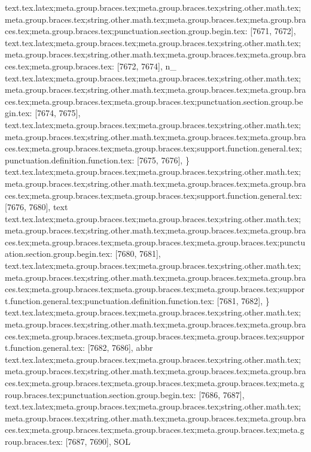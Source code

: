 {{{{{{{{{{{{{{{{{{{{{{{{{{{{{{{{{{{{{{{{{{{{{{{{{{{{{{{{{{{{{{{{{{{{{{{{{{{{{{{{{{{{{{{{{{{{{{{{{{{{{{{{{{{{{{{{{{{{{{{{{{{{{{{{{{{{{{{{{{{{{{{{{{{{{{{{{{{{{{{{{{{{{{{{{{{{{{{{{{{{{{{{{{{{{{{{{{{{{{{{{{{{{{{{{{{{{{{{{{text.tex.latex;meta.group.braces.tex;meta.group.braces.tex;string.other.math.tex;meta.group.braces.tex;string.other.math.tex;meta.group.braces.tex;meta.group.braces.tex;meta.group.braces.tex;punctuation.section.group.begin.tex: [7671, 7672], {{}
text.tex.latex;meta.group.braces.tex;meta.group.braces.tex;string.other.math.tex;meta.group.braces.tex;string.other.math.tex;meta.group.braces.tex;meta.group.braces.tex;meta.group.braces.tex: [7672, 7674], {n_}
text.tex.latex;meta.group.braces.tex;meta.group.braces.tex;string.other.math.tex;meta.group.braces.tex;string.other.math.tex;meta.group.braces.tex;meta.group.braces.tex;meta.group.braces.tex;meta.group.braces.tex;punctuation.section.group.begin.tex: [7674, 7675], {{}
text.tex.latex;meta.group.braces.tex;meta.group.braces.tex;string.other.math.tex;meta.group.braces.tex;string.other.math.tex;meta.group.braces.tex;meta.group.braces.tex;meta.group.braces.tex;meta.group.braces.tex;support.function.general.tex;punctuation.definition.function.tex: [7675, 7676], {\}
text.tex.latex;meta.group.braces.tex;meta.group.braces.tex;string.other.math.tex;meta.group.braces.tex;string.other.math.tex;meta.group.braces.tex;meta.group.braces.tex;meta.group.braces.tex;meta.group.braces.tex;support.function.general.tex: [7676, 7680], {text}
text.tex.latex;meta.group.braces.tex;meta.group.braces.tex;string.other.math.tex;meta.group.braces.tex;string.other.math.tex;meta.group.braces.tex;meta.group.braces.tex;meta.group.braces.tex;meta.group.braces.tex;meta.group.braces.tex;punctuation.section.group.begin.tex: [7680, 7681], {{}
text.tex.latex;meta.group.braces.tex;meta.group.braces.tex;string.other.math.tex;meta.group.braces.tex;string.other.math.tex;meta.group.braces.tex;meta.group.braces.tex;meta.group.braces.tex;meta.group.braces.tex;meta.group.braces.tex;support.function.general.tex;punctuation.definition.function.tex: [7681, 7682], {\}
text.tex.latex;meta.group.braces.tex;meta.group.braces.tex;string.other.math.tex;meta.group.braces.tex;string.other.math.tex;meta.group.braces.tex;meta.group.braces.tex;meta.group.braces.tex;meta.group.braces.tex;meta.group.braces.tex;support.function.general.tex: [7682, 7686], {abbr}
text.tex.latex;meta.group.braces.tex;meta.group.braces.tex;string.other.math.tex;meta.group.braces.tex;string.other.math.tex;meta.group.braces.tex;meta.group.braces.tex;meta.group.braces.tex;meta.group.braces.tex;meta.group.braces.tex;meta.group.braces.tex;punctuation.section.group.begin.tex: [7686, 7687], {{}
text.tex.latex;meta.group.braces.tex;meta.group.braces.tex;string.other.math.tex;meta.group.braces.tex;string.other.math.tex;meta.group.braces.tex;meta.group.braces.tex;meta.group.braces.tex;meta.group.braces.tex;meta.group.braces.tex;meta.group.braces.tex: [7687, 7690], {SOL}
}}}}}}}}}}}}}}}}}}}}}}}}}}}}}}}}}}}}}}}}}}}}}}}}}}}}}}}}}}}}}}}}}}}}}}}}}}}}}}}}}}}}}}}}}}}}}}}}}}}}}}}}}}}}}}}}}}}}}}}}}}}}}}}}}}}}}}}}}}}}}}}}}}}}}}}}}}}}}}}}}}}}}}}}}}}}}}}}}}}}}}}}}}}}}}}}}}}}}}}}}}}}}}}}}}}}}}}}}}}}}}}}
